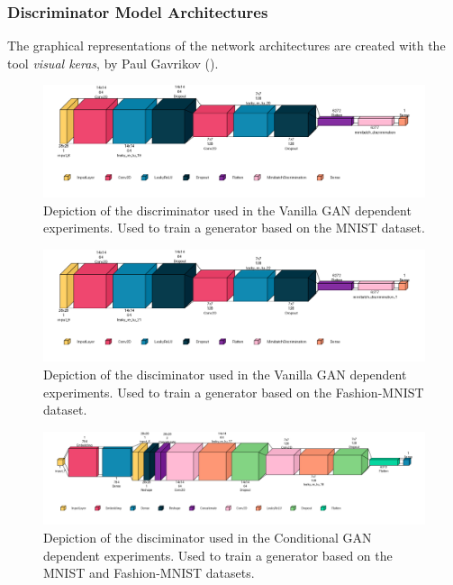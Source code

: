 \subsubsection{Discriminator Model Architectures}\label{appendix_discriminator_architectures}
The graphical representations of the network architectures are created with the tool \textit{visual keras}, by Paul Gavrikov (\cite{Gavrikov2020VisualKeras}).

\begin{figure}[htbp]
    \centering
    \includegraphics[width=.9\textwidth]{abb/netron_network_archs/define_vanilla_mnist_disc.png}
    \caption{Depiction of the discriminator used in the Vanilla GAN dependent experiments. Used to train a generator based on the MNIST dataset.}
    \label{fig:figure_disc_arch_vanilla_mnist}
\end{figure}

\begin{figure}[htbp]
    \centering
    \includegraphics[width=.9\textwidth]{abb/netron_network_archs/define_vanilla_fashion_mnist_disc.png}
    \caption{Depiction of the disciminator used in the Vanilla GAN dependent experiments. Used to train a generator based on the Fashion-MNIST dataset.}
    \label{fig:figure_disc_arch_vanilla_fashion}
\end{figure}

\begin{figure}[htbp]
    \centering
    \vspace{-2em}
    \includegraphics[width=.9\textwidth]{abb/netron_network_archs/define_conditional_mnists_disc.png}
    \caption{Depiction of the disciminator used in the Conditional GAN dependent experiments. Used to train a generator based on the MNIST and Fashion-MNIST datasets.}
    \label{fig:figure_disc_arch_conditional}
\end{figure}

